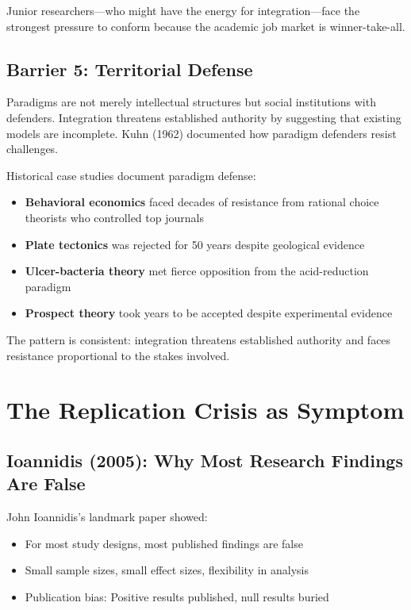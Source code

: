 \documentclass[12pt,a4paper]{article}
\begin{document}
Junior researchers---who might have the energy for integration---face the strongest pressure to conform because the academic job market is winner-take-all.

\subsection{Barrier 5: Territorial Defense}
\label{sec:barrier5}

Paradigms are not merely intellectual structures but social institutions with defenders. Integration threatens established authority by suggesting that existing models are incomplete. Kuhn (1962) documented how paradigm defenders resist challenges.

Historical case studies document paradigm defense:
\begin{itemize}
\item \textbf{Behavioral economics} faced decades of resistance from rational choice theorists who controlled top journals
\item \textbf{Plate tectonics} was rejected for 50 years despite geological evidence
\item \textbf{Ulcer-bacteria theory} met fierce opposition from the acid-reduction paradigm
\item \textbf{Prospect theory} took years to be accepted despite experimental evidence
\end{itemize}

The pattern is consistent: integration threatens established authority and faces resistance proportional to the stakes involved.

\section{The Replication Crisis as Symptom}
\label{sec:replication}

\subsection{Ioannidis (2005): Why Most Research Findings Are False}

John Ioannidis's landmark paper showed:
\begin{itemize}
\item For most study designs, most published findings are false
\item Small sample sizes, small effect sizes, flexibility in analysis
\item Publication bias: Positive results published, null results buried
\end{itemize}
\end{document}
